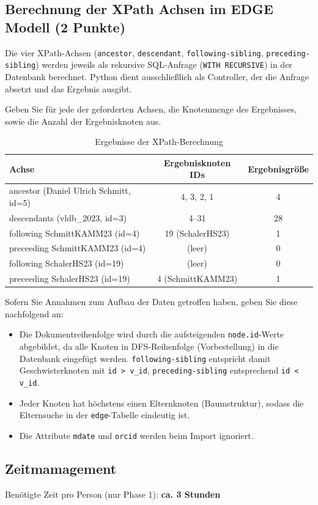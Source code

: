 \documentclass[11pt]{scrartcl}
\begin{document}
\subsection*{Berechnung der XPath Achsen im EDGE Modell (2 Punkte)}

Die vier XPath-Achsen (\texttt{ancestor}, \texttt{descendant}, \texttt{following-sibling},
\texttt{preceding-sibling}) werden jeweils als rekursive SQL-Anfrage (\texttt{WITH RECURSIVE})
in der Datenbank berechnet. Python dient ausschließlich als Controller, der die Anfrage absetzt
und das Ergebnis ausgibt.

Geben Sie für jede der geforderten Achsen, die Knotenmenge des Ergebnisses, sowie die Anzahl der Ergebnisknoten aus.

\begin{table}[h]
  \centering
    \begin{center}
      \begin{tabular}{ l | c c }
        \toprule
        Achse & Ergebnisknoten IDs & Ergebnisgröße\\
        \midrule
        ancestor (Daniel Ulrich Schmitt, id=5)  & 4, 3, 2, 1          & 4  \\
        descendants (vldb\_2023, id=3)          & 4--31               & 28 \\
        following SchmittKAMM23 (id=4)          & 19 (SchalerHS23)    & 1  \\
        preceeding SchmittKAMM23 (id=4)         & (leer)              & 0  \\
        following SchalerHS23 (id=19)           & (leer)              & 0  \\
        preceeding SchalerHS23 (id=19)          & 4 (SchmittKAMM23)   & 1  \\
        \bottomrule
      \end{tabular}
    \end{center}
  \caption{Ergebnisse der XPath-Berechnung}
  \label{tab:ErgebnisseDerXPathBerechnug}
\end{table}

Sofern Sie Annahmen zum Aufbau der Daten getroffen haben, geben Sie diese nachfolgend an:
\begin{itemize}
  \item Die Dokumentreihenfolge wird durch die aufsteigenden \texttt{node.id}-Werte abgebildet,
        da alle Knoten in DFS-Reihenfolge (Vorbestellung) in die Datenbank eingefügt werden.
        \texttt{following-sibling} entspricht damit Geschwisterknoten mit \texttt{id > v\_id},
        \texttt{preceding-sibling} entsprechend \texttt{id < v\_id}.
  \item Jeder Knoten hat höchstens einen Elternknoten (Baumstruktur), sodass die Elternsuche
        in der \texttt{edge}-Tabelle eindeutig ist.
  \item Die Attribute \texttt{mdate} und \texttt{orcid} werden beim Import ignoriert.
\end{itemize}

\subsection*{Zeitmamagement}

Benötigte Zeit pro Person (nur Phase 1): \textbf{ca. 3 Stunden}
\end{document}
